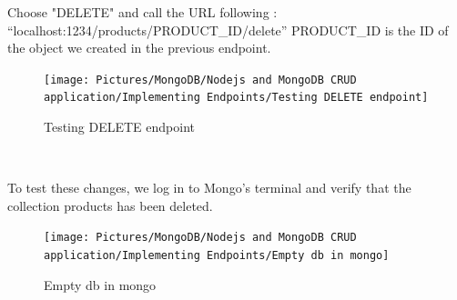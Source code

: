 \begin{spacing}{1.2}
\par Choose "DELETE" and call the URL
following : “localhost:1234/products/PRODUCT\_ID/delete” PRODUCT\_ID is the ID of the object we created in the previous endpoint.
\begin{figure}[!htb] 
\begin{center} 
\texttt{[image: Pictures/MongoDB/Nodejs and MongoDB CRUD  application/Implementing Endpoints/Testing DELETE endpoint]} 
\end{center} 
\caption{Testing DELETE endpoint} 
\end{figure}  \FloatBarrier
\\
\newpage
\par To test these changes, we log in to Mongo's terminal and verify that the collection
products has been deleted.
\\
\begin{figure}[!htb] 
\begin{center} 
\texttt{[image: Pictures/MongoDB/Nodejs and MongoDB CRUD  application/Implementing Endpoints/Empty db in mongo]} 
\end{center} 
\caption{Empty db in mongo} 
\end{figure}  \FloatBarrier
\\

\end{spacing}